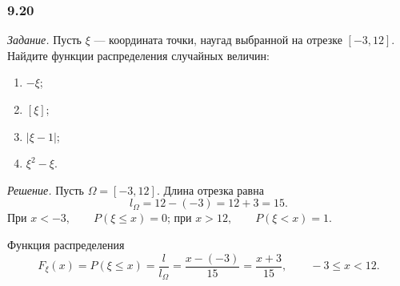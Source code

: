 \subsubsection*{9.20}

\textit{Задание.} Пусть $ \xi $ --- координата точки, наугад выбранной на отрезке $ \left[ -3, 12 \right] $.
Найдите функции распределения случайных величин:
\begin{enumerate}[label=\alph*)]
\item $- \xi$;
\item $ \left[ \xi \right] $;
\item $ \left| \xi - 1 \right| $;
\item $ \xi^2 - \xi $.
\end{enumerate}

\textit{Решение.} Пусть $ \Omega = \left[ -3, 12 \right] $.
Длина отрезка равна
$$l_{ \Omega } =
12 - \left( -3 \right) =
12+3 =
15.$$
При $x < -3, \qquad P \left( \xi \leq x \right) = 0$; при $x > 12, \qquad P \left( \xi < x \right) = 1$.

Функция распределения
$$F_{ \xi } \left( x \right) =
P \left( \xi \leq x \right) =
\frac{l}{l_{ \Omega }} =
\frac{x - \left( -3 \right) }{15} =
\frac{x+3}{15}, \qquad -3 \leq x < 12.$$

